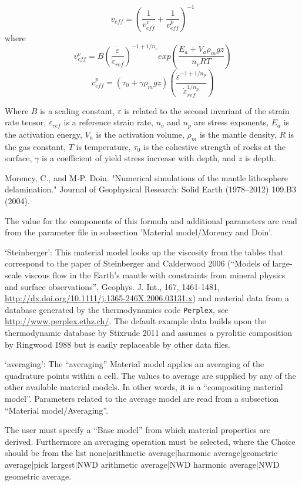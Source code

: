 \begin{itemize}
 \[v_{eff} = \left(\frac{1}{v_{eff}^v}+\frac{1}{v_{eff}^p}\right)^{-1}\] where \[v_{eff}^v = B \left(\frac{\dot{\varepsilon}}{\dot{\varepsilon}_{ref}}\right)^{-1+1/n_v} exp\left(\frac{E_a +V_a \rho_m g z}{n_v R T}\right) \] \[v_{eff}^p = (\tau_0 + \gamma \rho_m g z) \left( \frac{\dot{\varepsilon}^{-1+1/n_p}} {\dot{\varepsilon}_{ref}^{1/n_p}} \right) \]

 Where $B$ is a scaling constant, $\dot{\varepsilon}$ is related to the second invariant of the strain rate tensor, $\dot{\varepsilon}_{ref}$ is a reference strain rate, $n_v$ and $n_p$ are stress exponents, $E_a$ is the activation energy, $V_a$ is the activation volume, $\rho_m$ is the mantle density, $R$ is the gas constant, $T$ is temperature, $\tau_0$ is the cohestive strength of rocks at the surface, $\gamma$ is a coefficient of yield stress increase with depth, and $z$ is depth. 

 Morency, C., and M‐P. Doin. "Numerical simulations of the mantle lithosphere delamination." Journal of Geophysical Research: Solid Earth (1978–2012) 109.B3 (2004).

 The value for the components of this formula and additional parameters are read from the parameter file in subsection 'Material model/Morency and Doin'.

`Steinberger': This material model looks up the viscosity from the tables that correspond to the paper of Steinberger and Calderwood 2006 (``Models of large-scale viscous flow in the Earth's mantle with constraints from mineral physics and surface observations'', Geophys. J. Int., 167, 1461-1481, \url{http://dx.doi.org/10.1111/j.1365-246X.2006.03131.x}) and material data from a database generated by the thermodynamics code \texttt{Perplex}, see \url{http://www.perplex.ethz.ch/}. The default example data builds upon the thermodynamic database by Stixrude 2011 and assumes a pyrolitic composition by Ringwood 1988 but is easily replaceable by other data files. 

`averaging': The ``averaging'' Material model applies an averaging of the quadrature points within a cell. The values to average are supplied by any of the other available material models. In other words, it is a ``compositing material model''. Parameters related to the average model are read from a subsection ``Material model/Averaging''. 

The user must specify a ``Base model'' from which material properties are derived. Furthermore an averaging operation must be selected, where the Choice should be from the list none|arithmetic average|harmonic average|geometric average|pick largest|NWD arithmetic average|NWD harmonic average|NWD geometric average. 


\end{itemize}
